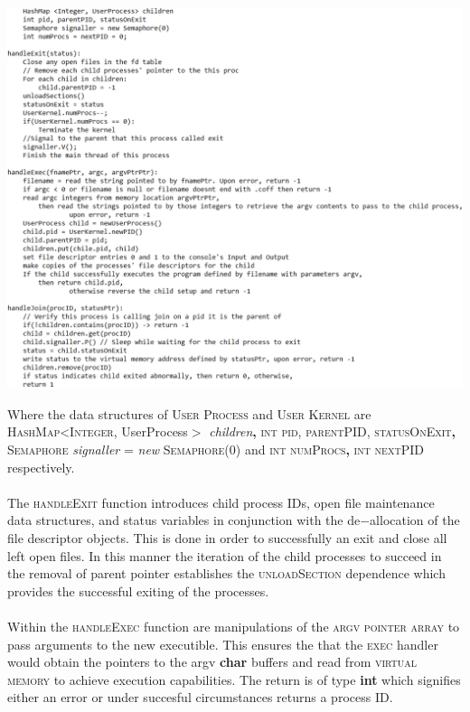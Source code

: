 \documentclass[12pt]{article}
\begin{document}
{\begin{center}\includegraphics[width=150mm]{pic3_3.png}\end{center}
Where the data structures of \textsc{User Process} and \textsc{User Kernel} are \textsc{HashMap<Integer}, {UserProcess}$>$ \textit{children}\textbf{,} \textsc{int pid}, \textsc{parentPID}, \textsc{statusOnExit}\textbf{,} \textsc{Semaphore} \textit{signaller} = \textit{new} \textsc{Semaphore}(0) 
and \textsc{int numProcs}\textbf{,} \textsc{int nextPID} respectively.
\paragraph{}The \textsc{handleExit} function introduces child process IDs, open file maintenance
data structures, and status variables in conjunction with the de$-$allocation of the 
file descriptor objects. This is done in order to successfully an exit and close all left open files.
In this manner the iteration of the child processes to succeed in the removal of parent pointer 
establishes the \textsc{unloadSection} dependence which provides the successful exiting of the processes.    
\paragraph{}Within the \textsc{handleExec} function are manipulations of the \textsc{argv pointer array} to pass arguments to the new executible. This ensures the that the \textsc{exec} handler would obtain the pointers to the {argv} \textbf{char} buffers and read from \textsc{virtual memory} to achieve execution capabilities. The return is of type \textbf{int} which signifies either an error or under succesful circumstances returns a process ID.
}
\end{document}
